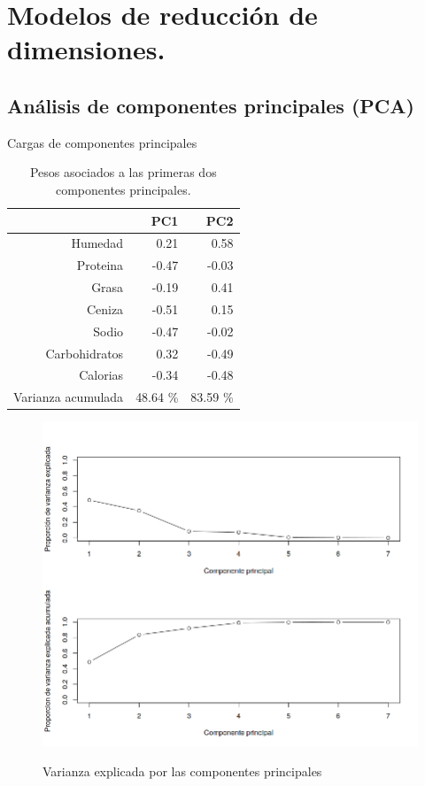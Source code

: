 \documentclass[pdf]{beamer}
\begin{document}
\section{Modelos de reducción de dimensiones.}

\subsection{Análisis de componentes principales (PCA)}

\begin{frame}{Cargas de componentes principales}
\begin{table}[ht]
\centering
\begin{tabular}{rrr}
  \hline
 & PC1 & PC2 \\ 
  \hline
Humedad & 0.21 & 0.58 \\ 
  Proteina & -0.47 & -0.03 \\ 
  Grasa & -0.19 & 0.41 \\ 
  Ceniza & -0.51 & 0.15 \\ 
  Sodio & -0.47 & -0.02 \\ 
  Carbohidratos & 0.32 & -0.49 \\ 
  Calorias & -0.34 & -0.48 \\ 
  Varianza acumulada & 48.64 \% &  83.59 \% \\ 
\end{tabular}
	\label{tabla:pesos_PCA}
	\caption{Pesos asociados a las primeras dos componentes principales.}
\end{table}
\end{frame}


\begin{frame}
\begin{figure}[h]
\centering
	\includegraphics[scale=.35]{images/varPCA.png} 
	\label{i_var_PCA}
	\caption{Varianza explicada por las componentes principales}
\end{figure}
\end{frame}
\end{document}
